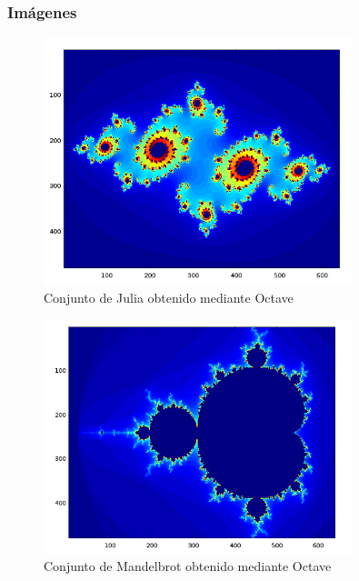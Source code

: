 \documentclass[8pt]{beamer}
\begin{document}
\subsubsection{Imágenes}
\begin{frame}

\begin{minipage}{0.48\textwidth}
\begin{figure}[hbtp]
\centering
\includegraphics[width = 0.8\textwidth]{img/JuliaOctave.png}
\caption{Conjunto de Julia obtenido mediante Octave}
\label{fig:JuliaOctave}
\end{figure}
\end{minipage}
\begin{minipage}{0.48\textwidth}
\begin{figure}[hbtp]
\centering
\includegraphics[width = 0.8\textwidth]{img/mandelbrotOctave.png}
\caption{Conjunto de Mandelbrot obtenido mediante Octave}
\label{fig:MandelbrotOctave}
\end{figure}
\end{minipage}
\end{frame}
\end{document}
